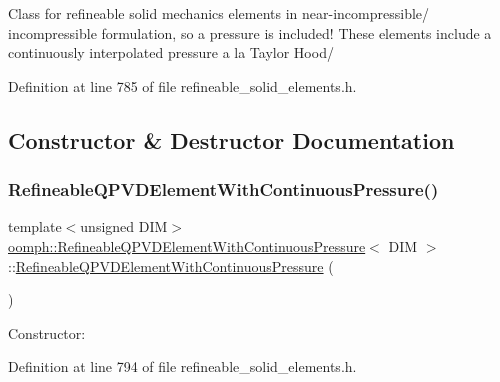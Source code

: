 Class for refineable solid mechanics elements in near-\/incompressible/ incompressible formulation, so a pressure is included! These elements include a continuously interpolated pressure a la Taylor Hood/ 

Definition at line 785 of file refineable\+\_\+solid\+\_\+elements.\+h.



\subsection{Constructor \& Destructor Documentation}
\mbox{\label{classoomph_1_1RefineableQPVDElementWithContinuousPressure_a5aca54f4029d1f729f7154df7c8c66da}} 
\subsubsection{\texorpdfstring{Refineable\+Q\+P\+V\+D\+Element\+With\+Continuous\+Pressure()}{RefineableQPVDElementWithContinuousPressure()}}
{\footnotesize\ttfamily template$<$unsigned D\+IM$>$ \\
\hyperlink{classoomph_1_1RefineableQPVDElementWithContinuousPressure}{oomph\+::\+Refineable\+Q\+P\+V\+D\+Element\+With\+Continuous\+Pressure}$<$ D\+IM $>$\+::\hyperlink{classoomph_1_1RefineableQPVDElementWithContinuousPressure}{Refineable\+Q\+P\+V\+D\+Element\+With\+Continuous\+Pressure} (\begin{DoxyParamCaption}{ }\end{DoxyParamCaption})\hspace{0.3cm}{\ttfamily [inline]}}



Constructor\+: 



Definition at line 794 of file refineable\+\_\+solid\+\_\+elements.\+h.




